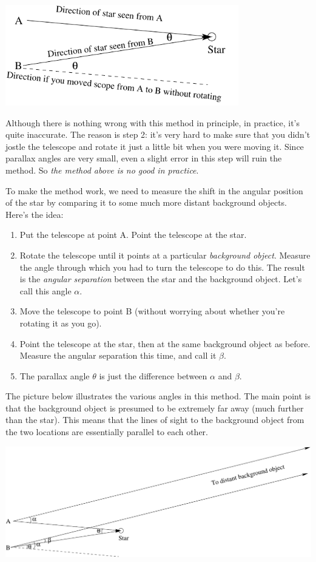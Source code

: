 \centerline{\includegraphics[width=4in]{parallax/parallax.pdf}}

Although there is nothing wrong with this method in principle,
in practice, it's quite inaccurate.  The reason is step 2: it's very hard
to make sure that you didn't jostle the telescope and rotate it just a little
bit when you were moving it.  Since parallax angles are very small, even
a slight error in this step will ruin the method.  So {\it the method above
is no good in practice}.

\pagebreak[2]

To make the method work, we need to measure the shift in the angular
position of the star by comparing it to some much more distant background
objects.  Here's the idea:
\begin{enumerate}
\item Put the telescope at point A.  Point the telescope at the
star.
\item Rotate the telescope until it points at a particular {\it background
object}.  Measure the angle through which you had to turn the telescope
to do this.  The result is the {\it angular separation} between the
star and the background object.  Let's call this angle $\alpha$.
\item Move the telescope to point B (without worrying about whether
you're rotating it as you go).
\item Point the telescope at the star, then at the same background
object as before.  Measure the angular separation this time, and call
it $\beta$.
\item The parallax angle $\theta$ is just the difference between
$\alpha$ and $\beta$.
\end{enumerate}
The picture below illustrates the various angles in this
method.  The main point is that
the background object is presumed to be extremely far away (much further
than the star).  This means that the lines of sight to the background
object from the two locations are essentially parallel to each other.

\centerline{\includegraphics[width=6in]{parallax/parallax2.pdf}}


